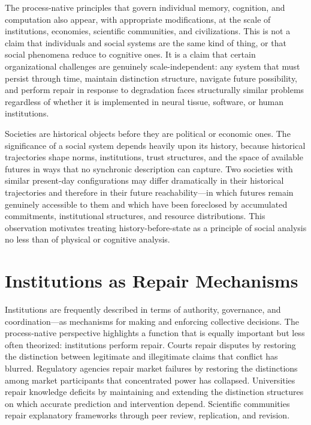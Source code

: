 \documentclass[11pt, oneside]{book}
\theoremstyle{definition}
\theoremstyle{remark}
\begin{document}
The process-native principles that govern individual memory, cognition, and computation also appear, with appropriate modifications, at the scale of institutions, economies, scientific communities, and civilizations. This is not a claim that individuals and social systems are the same kind of thing, or that social phenomena reduce to cognitive ones. It is a claim that certain organizational challenges are genuinely scale-independent: any system that must persist through time, maintain distinction structure, navigate future possibility, and perform repair in response to degradation faces structurally similar problems regardless of whether it is implemented in neural tissue, software, or human institutions.

Societies are historical objects before they are political or economic ones. The significance of a social system depends heavily upon its history, because historical trajectories shape norms, institutions, trust structures, and the space of available futures in ways that no synchronic description can capture. Two societies with similar present-day configurations may differ dramatically in their historical trajectories and therefore in their future reachability—in which futures remain genuinely accessible to them and which have been foreclosed by accumulated commitments, institutional structures, and resource distributions. This observation motivates treating history-before-state as a principle of social analysis no less than of physical or cognitive analysis.

\section{Institutions as Repair Mechanisms}

Institutions are frequently described in terms of authority, governance, and coordination—as mechanisms for making and enforcing collective decisions. The process-native perspective highlights a function that is equally important but less often theorized: institutions perform repair. Courts repair disputes by restoring the distinction between legitimate and illegitimate claims that conflict has blurred. Regulatory agencies repair market failures by restoring the distinctions among market participants that concentrated power has collapsed. Universities repair knowledge deficits by maintaining and extending the distinction structures on which accurate prediction and intervention depend. Scientific communities repair explanatory frameworks through peer review, replication, and revision.
\end{document}

